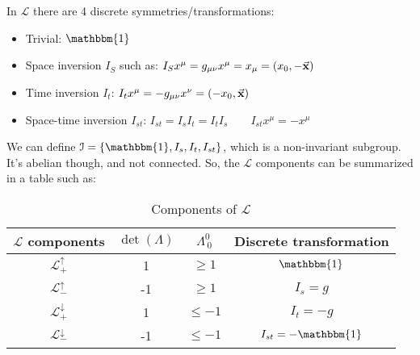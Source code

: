 \documentclass[../../main/main.tex]{subfiles}
\begin{document}
In \( \mathcal{L} \) there are 4 discrete symmetries/transformations:
\begin{itemize}
    \item Trivial: \( \mathbbm{1} \)

    \item Space inversion \( I_S \) such as: \( I_S x^{\mu} = g_{\mu \nu} x^{\mu} = x_{\mu} = (x_0, -\va{x} ) \)

    \item Time inversion \( I_t \): \( I_t x^{\mu } = - g_{\mu \nu} x^{\nu} = (-x_0, \va{x} ) \)

    \item Space-time inversion \( I_{st} \): \( I_{st} = I_s I_t = I_t I_s  \qquad I_{st} x^{\mu} = -x^{\mu} \)
\end{itemize}

We can define \( \mathcal{I} = \{ \mathbbm{1}, I_s, I_t, I_{st} \} \), which is a non-invariant subgroup. It's abelian though, and not connected. So, the \( \mathcal{L} \) components can be summarized in a table such as:

\begin{table}[h]
    \centering
    \begin{tabular}{|c|c|c|c|}
        \hline
        \( \mathcal{L} \) components    &   \( \det(\Lambda )  \)   &   \( \Lambda^{0}_{\ 0}  \)    &   Discrete transformation \\
        \hline
        \( \mathcal{L}^{\uparrow}_{+} \)    &   1  &   \( \ge 1 \) &   \( \mathbbm{1} \)   \\
        \( \mathcal{L}^{\uparrow}_{-} \)    &   -1  &   \( \ge 1 \) &   \( I_s = g \)   \\
        \( \mathcal{L}^{\downarrow}_{+} \)    &   1  &   \( \le -1 \) &   \( I_t = -g \)   \\
        \( \mathcal{L}^{\downarrow}_{-} \)    &   -1  &   \( \le -1 \) &   \( I_{st} = -\mathbbm{1} \)  \\
        \hline
    \end{tabular}
    \caption{Components of \( \mathcal{L} \) }
    \label{}
\end{table}
\end{document}
